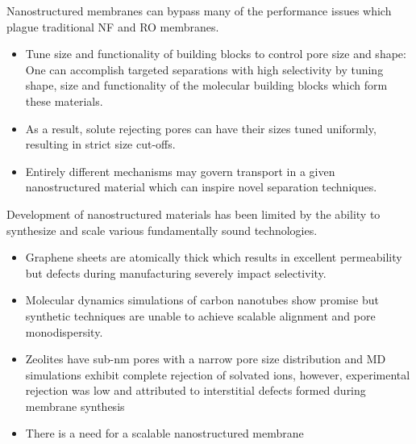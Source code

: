 \documentclass{article}
\begin{document}
  Nanostructured membranes can bypass many of the performance issues which
  plague traditional NF and RO membranes.
  \begin{itemize}
    \item Tune size and functionality of building blocks to control pore
    size and shape: One can accomplish targeted separations with high 
    selectivity by tuning shape, size and functionality of the molecular
    building blocks which form these materials. 
    \item As a result, solute rejecting pores can have their sizes tuned
    uniformly, resulting in strict size cut-offs.
    \item Entirely different mechanisms may govern transport in a given
    nanostructured material which can inspire novel separation techniques.
  \end{itemize}
  
  Development of nanostructured materials has been limited by the ability
  to synthesize and scale various fundamentally sound technologies.
  \begin{itemize}
    \item Graphene sheets are atomically thick which results in excellent
    permeability but defects during manufacturing severely impact 
    selectivity. \cite{cohen-tanugi_multilayer_2016}
    \item Molecular dynamics simulations of carbon nanotubes show
    promise \cite{humplik_nanostructured_2011} but synthetic techniques are 
    unable to achieve scalable alignment and pore monodispersity.\cite{hata_water-assisted_2004,maruyama_growth_2005}
    \item Zeolites have sub-nm pores with a narrow pore size 
    distribution and MD simulations exhibit complete rejection of solvated ions, \cite{murad_molecular_1998}
    however, experimental rejection was low and attributed to interstitial
    defects formed during membrane synthesis \cite{li_desalination_2004}
    \item There is a need for a scalable nanostructured membrane
  \end{itemize}
  
\end{document}
